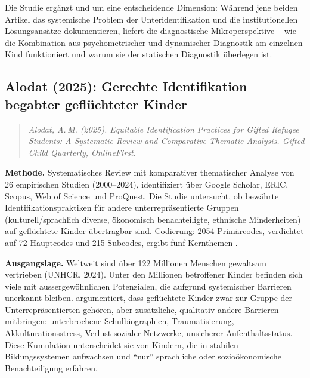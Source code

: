 \documentclass[ngerman, a4paper]{article}
\begin{document}
Die Studie ergänzt \textcite{mun2020identifying} und
\textcite{gubbins2020promising} um eine entscheidende Dimension: Während
jene beiden Artikel das systemische Problem der Unteridentifikation und die
institutionellen Lösungsansätze dokumentieren, liefert
\textcite{alhroub2021utility} die diagnostische Mikroperspektive -- wie die
Kombination aus psychometrischer und dynamischer Diagnostik am einzelnen
Kind funktioniert und warum sie der statischen Diagnostik überlegen ist.


\subsection*{Alodat (2025): Gerechte Identifikation begabter
  geflüchteter Kinder}
\label{subsec:alodat2025}

\begin{quote}\itshape
  Alodat, A.\,M. (2025). Equitable Identification Practices for Gifted
  Refugee Students: A Systematic Review and Comparative Thematic Analysis.
  \upshape Gifted Child Quarterly, OnlineFirst.
\end{quote}

\textbf{Methode.} Systematisches Review mit komparativer thematischer
Analyse von 26 empirischen Studien (2000--2024), identifiziert über Google
Scholar, ERIC, Scopus, Web of Science und ProQuest. Die Studie untersucht,
ob bewährte Identifikationspraktiken für andere unterrepräsentierte Gruppen
(kulturell/sprachlich diverse, ökonomisch benachteiligte, ethnische
Minderheiten) auf geflüchtete Kinder übertragbar sind. Codierung: 2054
Primärcodes, verdichtet auf 72 Hauptcodes und 215 Subcodes, ergibt fünf
Kernthemen \parencite{alodat2025equitable}.

\textbf{Ausgangslage.} Weltweit sind über 122 Millionen Menschen
gewaltsam vertrieben (UNHCR, 2024). Unter den Millionen betroffener Kinder
befinden sich viele mit aussergewöhnlichen Potenzialen, die aufgrund
systemischer Barrieren unerkannt bleiben. \textcite{alodat2025equitable} argumentiert, dass
geflüchtete Kinder zwar zur Gruppe der Unterrepräsentierten gehören, aber
zusätzliche, qualitativ andere Barrieren mitbringen: unterbrochene
Schulbiographien, Traumatisierung, Akkulturationsstress, Verlust sozialer
Netzwerke, unsicherer Aufenthaltsstatus. Diese Kumulation unterscheidet
sie von Kindern, die in stabilen Bildungssystemen aufwachsen und
\enquote{nur} sprachliche oder sozioökonomische Benachteiligung erfahren.
\end{document}
